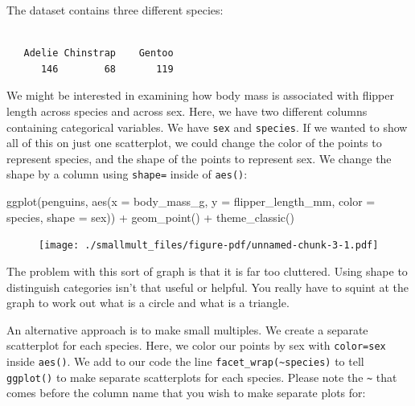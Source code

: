 \documentclass[
  letterpaper,
  DIV=11,
  numbers=noendperiod]{scrreprt}
\newenvironment{Shaded}{\begin{snugshade}}{\end{snugshade}}
\newcommand{\AttributeTok}[1]{\textcolor[rgb]{0.40,0.45,0.13}{#1}}
\newcommand{\FunctionTok}[1]{\textcolor[rgb]{0.28,0.35,0.67}{#1}}
\newcommand{\NormalTok}[1]{\textcolor[rgb]{0.00,0.23,0.31}{#1}}
\newcommand{\SpecialCharTok}[1]{\textcolor[rgb]{0.37,0.37,0.37}{#1}}
\begin{document}
The dataset contains three different species:

\begin{Shaded}
\end{Shaded}

\begin{verbatim}

   Adelie Chinstrap    Gentoo 
      146        68       119 
\end{verbatim}

We might be interested in examining how body mass is associated with
flipper length across species and across sex. Here, we have two
different columns containing categorical variables. We have \texttt{sex}
and \texttt{species}. If we wanted to show all of this on just one
scatterplot, we could change the color of the points to represent
species, and the shape of the points to represent sex. We change the
shape by a column using \texttt{shape=} inside of \texttt{aes()}:

\begin{Shaded}
\begin{Highlighting}[]
\FunctionTok{ggplot}\NormalTok{(penguins, }\FunctionTok{aes}\NormalTok{(}\AttributeTok{x =}\NormalTok{ body\_mass\_g,  }\AttributeTok{y =}\NormalTok{ flipper\_length\_mm, }
                     \AttributeTok{color =}\NormalTok{ species, }\AttributeTok{shape =}\NormalTok{ sex)) }\SpecialCharTok{+} 
  \FunctionTok{geom\_point}\NormalTok{() }\SpecialCharTok{+}
  \FunctionTok{theme\_classic}\NormalTok{()}
\end{Highlighting}
\end{Shaded}

\begin{figure}[H]

{\centering \texttt{[image: ./smallmult\_files/figure-pdf/unnamed-chunk-3-1.pdf]}

}

\end{figure}

The problem with this sort of graph is that it is far too cluttered.
Using shape to distinguish categories isn't that useful or helpful. You
really have to squint at the graph to work out what is a circle and what
is a triangle.

An alternative approach is to make small multiples. We create a separate
scatterplot for each species. Here, we color our points by sex with
\texttt{color=sex} inside \texttt{aes()}. We add to our code the line
\texttt{facet\_wrap(\textasciitilde{}species)} to tell \texttt{ggplot()}
to make separate scatterplots for each species. Please note the
\texttt{\textasciitilde{}} that comes before the column name that you
wish to make separate plots for:
\end{document}
